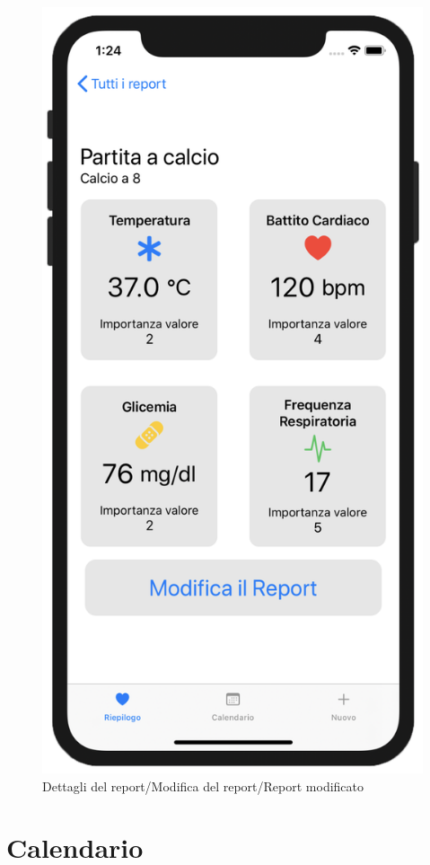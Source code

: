 \documentclass{article}
\begin{document}
\begin{figure}[htp]
\includegraphics[width=.32\textwidth]{img/ReportView1.png}

\caption{Dettagli del report/Modifica del report/Report modificato}
\label{fig:figure4}

\end{figure}


\newpage
\section{Calendario}
\end{document}
